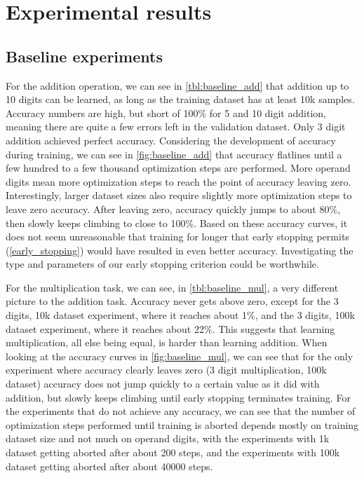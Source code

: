 \section{Experimental results}



\subsection{Baseline experiments}
\label{results:baseline}

For the addition operation, we can see in \cref{tbl:baseline_add} that addition up to 10 digits can be learned, as long as the training dataset has at least 10k samples. Accuracy numbers are high, but short of 100\% for 5 and 10 digit addition, meaning there are quite a few errors left in the validation dataset. Only 3 digit addition achieved perfect accuracy.
Considering the development of accuracy during training, we can see in \cref{fig:baseline_add} that accuracy flatlines until a few hundred to a few thousand optimization steps are performed. More operand digits mean more optimization steps to reach the point of accuracy leaving zero. Interestingly, larger dataset sizes also require slightly more optimization steps to leave zero accuracy.
After leaving zero, accuracy quickly jumps to about 80\%, then slowly keeps climbing to close to 100\%.
Based on these accuracy curves, it does not seem unreasonable that training for longer that early stopping permits (\cref{early_stopping}) would have resulted in even better accuracy. Investigating the type and parameters of our early stopping criterion could be worthwhile.


For the multiplication task, we can see, in \cref{tbl:baseline_mul}, a very different picture to the addition task. Accuracy never gets above zero, except for the 3 digits, 10k dataset experiment, where it reaches about 1\%, and the 3 digits, 100k dataset experiment, where it reaches about 22\%.
This suggests that learning multiplication, all else being equal, is harder than learning addition.
When looking at the accuracy curves in  \cref{fig:baseline_mul}, we can see that for the only experiment where accuracy clearly leaves zero (3 digit multiplication, 100k dataset) accuracy does not jump quickly to a certain value as it did with addition, but slowly keeps climbing until early stopping terminates training.
For the experiments that do not achieve any accuracy, we can see that the number of optimization steps performed until training is aborted depends mostly on training dataset size and not much on operand digits, with the experiments with 1k dataset getting aborted after about 200 steps, and the experiments with 100k dataset getting aborted after about 40000 steps.


